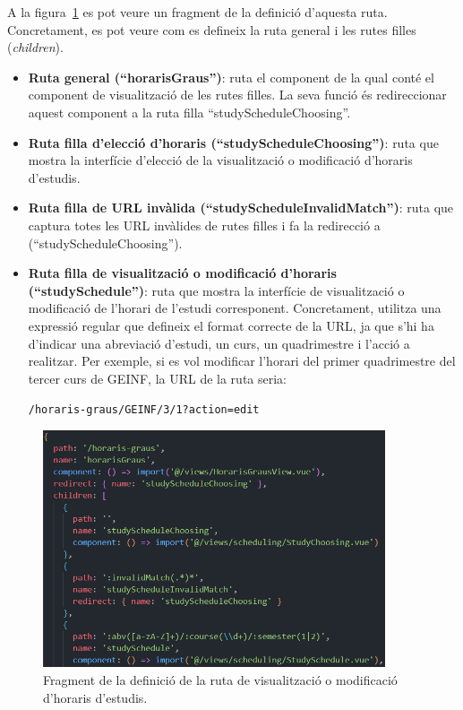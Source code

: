 \documentclass[a4paper,12pt]{ThesisStyle}
\begin{document}
A la figura~\ref{img:rutaHoraris} es pot veure un fragment de la definició d'aquesta ruta. Concretament, es pot veure com es defineix la ruta general i les rutes filles (\textit{children}).
\begin{itemize}
  \item \textbf{Ruta general (``horarisGraus'')}: ruta el component de la qual conté el component de visualització de les rutes filles. La seva funció és redireccionar aquest component a la ruta filla ``studyScheduleChoosing''.
  \item \textbf{Ruta filla d'elecció d'horaris (``studyScheduleChoosing'')}: ruta que mostra la interfície d'elecció de la visualització o modificació d'horaris d'estudis.
  \item \textbf{Ruta filla de URL invàlida (``studyScheduleInvalidMatch'')}: ruta que captura totes les URL invàlides de rutes filles i fa la redirecció a (``studyScheduleChoosing'').
  \item \textbf{Ruta filla de visualització o modificació d'horaris (``studySchedule'')}: ruta que mostra la interfície de visualització o modificació de l'horari de l'estudi corresponent. Concretament, utilitza una expressió regular que defineix el format correcte de la URL, ja que s'hi ha d'indicar una abreviació d'estudi, un curs, un quadrimestre i l'acció a realitzar. Per exemple, si es vol modificar l'horari del primer quadrimestre del tercer curs de GEINF, la URL de la ruta seria:\\[-0.6cm]
  \begin{center}
    \texttt{/horaris-graus/GEINF/3/1?action=edit}
  \end{center}
\end{itemize}

\begin{figure}[H]
  \centering
  \includegraphics[width=0.9\textwidth]{assets/code/enrutamentClient/rutaHoraris.png}
  \caption{\label{img:rutaHoraris} Fragment de la definició de la ruta de visualització o modificació d'horaris d'estudis.}
\end{figure}
\end{document}
